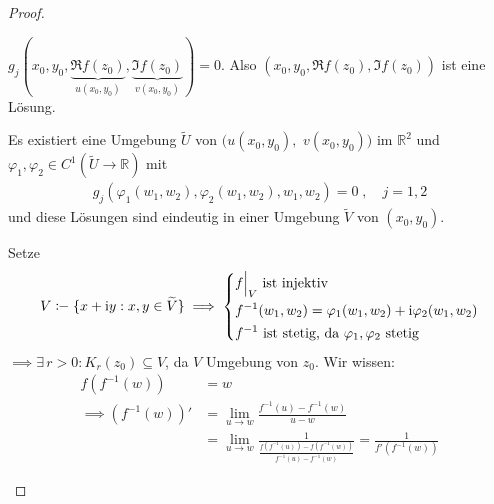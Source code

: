 \begin{theorem}
\begin{proof}
\begin{enum-arab}
      \item $g_j(x_0,y_0,\underbrace{\Re f(z_0)}_{u(x_0,y_0)},\underbrace{\Im f(z_0)}_{v(x_0,y_0)}) = 0$. Also $(x_0,y_0,\Re f(z_0),\Im f(z_0))$ ist eine Lösung.
      \begin{theorem*}
        Es existiert eine Umgebung $\widetilde{U}$ von $(u(x_0,y_0),$ $v(x_0,y_0))$ %
        im $\mathbb{R}^2$ und $\varphi_1,\varphi_2 \in C^1(\widetilde{U} \to \mathbb{R})$ mit
        \begin{align*}
          g_j(\varphi_1(w_1,w_2),\varphi_2(w_1,w_2),w_1,w_2) = 0 \; , \quad j=1,2
        \end{align*}
        und diese Lösungen sind eindeutig in einer Umgebung $\widetilde{V}$ von $(x_0,y_0)$.
      \end{theorem*}
      Setze
      \begin{align*}
        V \coloneq \{ x+\mathrm{i}y : x,y \in \widetilde{V} \}
        \implies
        \begin{dcases}
          f \Big|_{V} \text{ ist injektiv} \\
          f^{-1}(w_1,w_2) = \varphi_1(w_1,w_2) + \mathrm{i} \varphi_2(w_1,w_2) \\
          f^{-1} \text{ ist stetig, da } \varphi_1, \varphi_2 \text{ stetig}
        \end{dcases}
      \end{align*}
      $\implies \exists \, r > 0 : K_r(z_0) \subseteq V$, da $V$ Umgebung von $z_0$. Wir wissen:
      \begin{align*}
        f(f^{-1}(w)) &= w \\
        \implies
        (f^{-1}(w))' &= \lim\limits_{u \to w} \frac{f^{-1}(u) - f^{-1}(w)}{u - w} \\
        &= \lim\limits_{u \to w} \frac{1}{\frac{f(f^{-1}(u)) - f(f^{-1}(w))}{f^{-1}(u) - f^{-1}(w)}} = \frac{1}{f'(f^{-1}(w))}
      \end{align*}
    \end{enum-arab}
  \end{proof}
\end{theorem}

